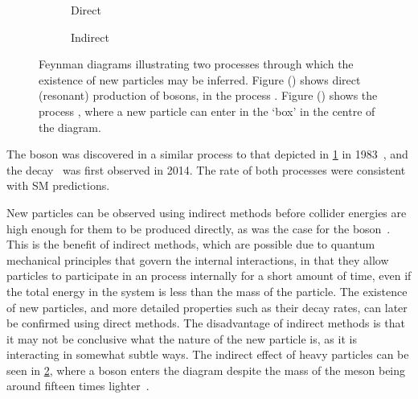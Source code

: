 \begin{figure}
  \begin{subfigure}[b]{0.4\textwidth}
    \centering
    
    \caption{Direct}
    \label{fig:intro:sm:particle_production:direct}
  \end{subfigure}
  \begin{subfigure}[b]{0.6\textwidth}
    \centering
    
    \caption{Indirect}
    \label{fig:intro:sm:particle_production:indirect}
  \end{subfigure}
  \caption{%
    Feynman diagrams illustrating two processes through which the existence of 
    new particles may be inferred.
    Figure () shows direct 
    (resonant) production of \PZ bosons, in the process 
    \decay{\Pelectron\APelectron}{\Pmuon\APmuon}.
    Figure () shows the 
    process \BsTomumu, where a new particle can enter in the `box' in the 
    centre of the diagram.
  }
  \label{fig:intro:sm:particle_production}
\end{figure}

The \PZ boson was discovered in a similar process to that depicted in 
\cref{fig:intro:sm:particle_production:direct} in 
1983~\cite{1983398,BAGNAIA1983130}, and the decay \BsTomumu\ was first observed 
in 2014.
The rate of both processes were consistent with \ac{SM} predictions.

New particles can be observed using indirect methods before collider energies 
are high enough for them to be produced directly, as was the case for the \PZ 
boson~\cite{HASERT1973138}.
This is the benefit of indirect methods, which are possible due to quantum 
mechanical principles that govern the internal interactions, in that they allow 
particles to participate in an process internally for a short amount of time, 
even if the total energy in the system is less than the mass of the particle.
The existence of new particles, and more detailed properties such as their 
decay rates, can later be confirmed using direct methods.
The disadvantage of indirect methods is that it may not be conclusive what the 
nature of the new particle is, as it is interacting in somewhat subtle ways.
The indirect effect of heavy particles can be seen in 
\cref{fig:intro:sm:particle_production:indirect}, where a \PW boson enters the 
diagram despite the mass of the \PBs meson being around fifteen times 
lighter~\cite{PDG2014}.

